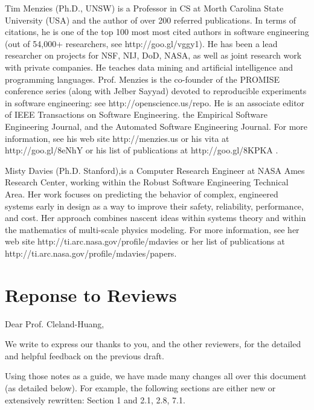 \documentclass[10pt,journal,compsoc]{IEEEtran}
\begin{document}
\begin{IEEEbiography}{Tim Menzies} (Ph.D., UNSW)
is a Professor in CS at Morth Carolina State University (USA) and  the author of
over 200 referred publications. In terms of citations, he is one of the top 100 most
most cited
authors in  software engineering (out of 54,000+ researchers, see
http://goo.gl/vggy1). He has been a lead researcher on
projects for NSF, NIJ, DoD, NASA, as well as joint research work with
private companies. He teaches data mining and artificial intelligence
and programming languages. Prof. Menzies is the co-founder of the
PROMISE conference series (along with Jelber Sayyad) devoted to reproducible experiments in
software engineering: see http://openscience.us/repo. He is an
associate editor of IEEE Transactions on Software Engineering. the Empirical Software Engineering Journal, and the
Automated Software Engineering Journal.  For more information, see his web site http://menzies.us
or his vita at http://goo.gl/8eNhY or his list of publications at
http://goo.gl/8KPKA .
\end{IEEEbiography}
 
\begin{IEEEbiography}{Misty Davies}
(Ph.D. Stanford),is a Computer Research Engineer at
  NASA Ames Research Center, working within the
  Robust Software Engineering Technical Area.  Her
  work focuses on predicting the behavior of
  complex, engineered systems early in design as a
  way to improve their safety, reliability,
  performance, and cost. Her approach combines
  nascent ideas within systems theory and within the
  mathematics of multi-scale physics modeling.
For more information, see her web site http://ti.arc.nasa.gov/profile/mdavies
or her  list of publications at
http://ti.arc.nasa.gov/profile/mdavies/papers.
\end{IEEEbiography}


\clearpage
 \setcounter{page}{1}
\section*{Reponse to Reviews}

Dear Prof. Cleland-Huang,


We write to express our thanks to you, and the other reviewers,
for the detailed and helpful feedback on the previous draft. 

Using those notes as a guide,
we have made many  changes all over this document (as detailed below). 
For example, the following sections are either new or extensively rewritten: Section 1 and 2.1, 2.8, 7.1.
\end{document}
